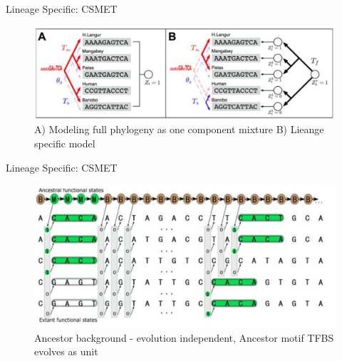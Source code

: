 \documentclass[10pt]{beamer}
\begin{document}

\begin{frame}[fragile]{Lineage Specific: CSMET}
\begin{figure}
\includegraphics[width=\linewidth]{images/csmet1.png}
\caption{A) Modeling full phylogeny as one component mixture B) Lieange specific model}
\end{figure}
\end{frame}

\begin{frame}[fragile]{Lineage Specific: CSMET}
\begin{figure}
\includegraphics[width=\linewidth]{images/csmet2.png}
\caption{Ancestor background - evolution independent, Ancestor motif TFBS evolves as unit}
\end{figure}
\end{frame}
\end{document}
